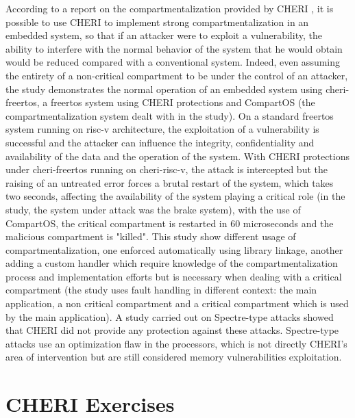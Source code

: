 \documentclass[a4paper, 11pt]{article}
\begin{document}
According to a report on the compartmentalization provided by CHERI \cite{almatary2022compartos}, it is possible to use CHERI to implement strong compartmentalization in an embedded system, so that if an attacker were to exploit a vulnerability, the ability to interfere with the normal behavior of the system that he would obtain would be reduced compared with a conventional system. Indeed, even assuming the entirety of a non-critical compartment to be under the control of an attacker, the study demonstrates the normal operation of an embedded system using \Gls{cheri-freertos}, a \Gls{freertos} system using CHERI protections and CompartOS (the compartmentalization system dealt with in the study). On a standard \Gls{freertos} system running on \Gls{risc-v} architecture, the exploitation of a vulnerability is successful and the attacker can influence the integrity, confidentiality and availability of the data and the operation of the system. With CHERI protections under \Gls{cheri-freertos} running on \Gls{cheri-risc-v}, the attack is intercepted but the raising of an untreated error forces a brutal restart of the system, which takes two seconds, affecting the availability of the system playing a critical role (in the study, the system under attack was the brake system), with the use of CompartOS, the critical compartment is restarted in 60 microseconds and the malicious compartment is "killed". This study show different usage of compartmentalization, one enforced automatically using library linkage, another adding a custom handler which require knowledge of the compartmentalization process and implementation efforts but is necessary when dealing with a critical compartment (the study uses fault handling in different context: the main application, a non critical compartment and a critical compartment which is used by the main application).
A study carried out on Spectre-type attacks \cite{fuchs2021developing} showed that CHERI did not provide any protection against these attacks. Spectre-type attacks use an optimization flaw in the processors, which is not directly CHERI's area of intervention but are still considered memory vulnerabilities exploitation.
\clearpage
\section{CHERI Exercises}
\end{document}
